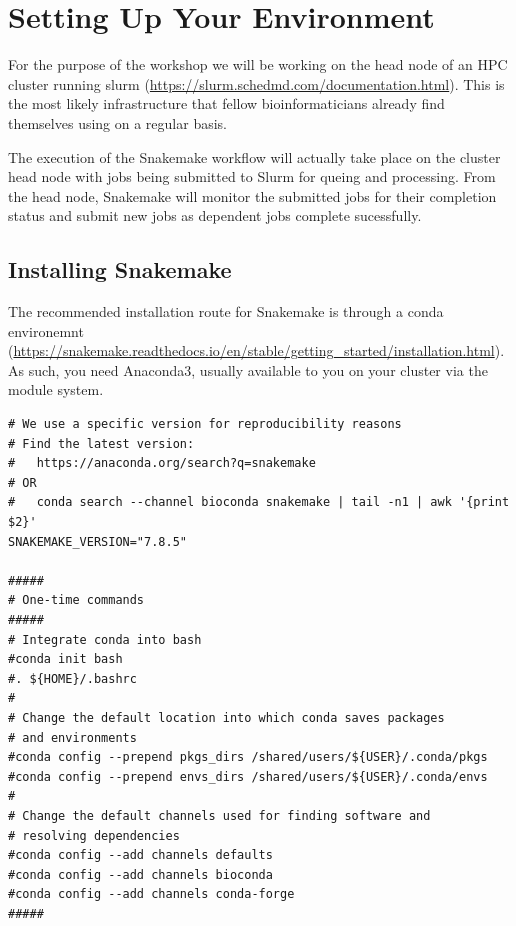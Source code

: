 
\section{Setting Up Your Environment}

For the purpose of the workshop we will be working on the head node of an HPC cluster running slurm (\url{https://slurm.schedmd.com/documentation.html}).
This is the most likely infrastructure that fellow bioinformaticians already find themselves using on a regular basis.

The execution of the Snakemake workflow will actually take place on the cluster head node with jobs being submitted to Slurm for queing and processing.
From the head node, Snakemake will monitor the submitted jobs for their completion status and submit new jobs as dependent jobs complete sucessfully.

\subsection{Installing Snakemake}

The recommended installation route for Snakemake is through a conda environemnt (\url{https://snakemake.readthedocs.io/en/stable/getting_started/installation.html}).
As such, you need Anaconda3, usually available to you on your cluster via the module system.

\begin{steps}
\begin{lstlisting}
# We use a specific version for reproducibility reasons
# Find the latest version:
#   https://anaconda.org/search?q=snakemake
# OR
#   conda search --channel bioconda snakemake | tail -n1 | awk '{print $2}'
SNAKEMAKE_VERSION="7.8.5"

#####
# One-time commands
#####
# Integrate conda into bash
#conda init bash
#. ${HOME}/.bashrc
#
# Change the default location into which conda saves packages
# and environments
#conda config --prepend pkgs_dirs /shared/users/${USER}/.conda/pkgs
#conda config --prepend envs_dirs /shared/users/${USER}/.conda/envs
#
# Change the default channels used for finding software and
# resolving dependencies
#conda config --add channels defaults
#conda config --add channels bioconda
#conda config --add channels conda-forge
#####
\end{lstlisting}

\end{steps}

